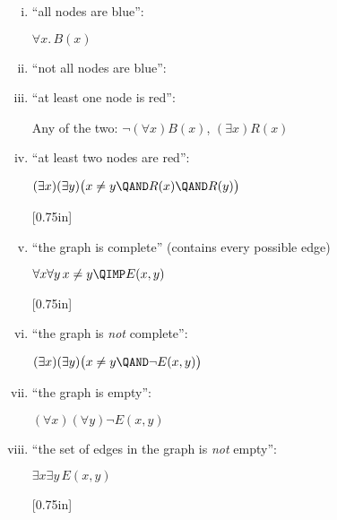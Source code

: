 \documentclass[quiz]{mcs}
\renewcommand{\examspace}{}  %
\begin{document}
\begin{problem}
\begin{enumerate}[(i)]
\item
``all nodes are blue'': 

\begin{solution}
$\forall x.\, B(x)$\hrulefill
\end{solution}

\item ``not all nodes are blue'': 

\item ``at least one node is red'': 

\begin{solution}
Any of the two: $\neg(\forall x)B(x)$, $(\exists x)R(x)$
\end{solution}

\item ``at least two nodes are red'': 

\begin{solution}
$(\exists x)(\exists y)\bigl( x\neq y \QAND R(x) \QAND R(y) \bigr)$
\end{solution}

\examspace[0.75in]

\item ``the graph is complete'' (contains every possible edge)

\begin{solution}
$\forall x\forall y\, x\neq y \QIMP E(x,y)$
\end{solution}

\examspace[0.75in]

\item ``the graph is \emph{not} complete'': 

\begin{solution}
$(\exists x)(\exists y)\bigl( x\neq y \QAND \neg E(x,y) \bigr)$
\end{solution}\hrulefill

\item ``the graph is empty'': 

\begin{solution}
$(\forall x)(\forall y) \neg E(x,y)$
\end{solution}

\item \label{item-fourth}
``the set of edges in the graph is \emph{not} empty'': 

\begin{solution}
$\exists x\exists y\, E(x,y)$
\end{solution}

\examspace[0.75in]


\end{enumerate}
\end{problem}
\end{document}
